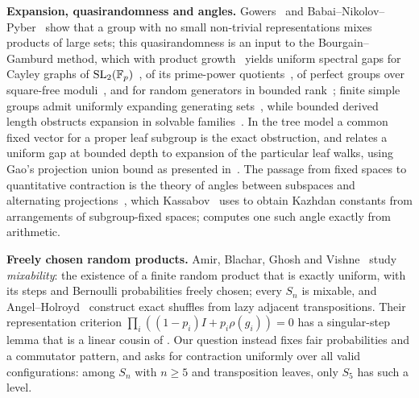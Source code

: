 \medskip\noindent\textbf{Expansion, quasirandomness and angles.}
Gowers~\cite{Gowers2008} and Babai--Nikolov--Pyber~\cite{BabaiNikolovPyber2008}
show that a group with no small non-trivial representations mixes
products of large sets; this quasirandomness is an input to the
Bourgain--Gamburd method, which with product
growth~\cite{Helfgott2008,BGT2011,PyberSzabo2016} yields uniform spectral
gaps for Cayley graphs of $\operatorname{SL}_2(\mathbb{F}_p)$~\cite{BourgainGamburd},
of its prime-power quotients~\cite{BourgainGamburdJEMS2008,BourgainVarju2012},
of perfect groups over square-free moduli~\cite{SalehiVarju}, and for
random generators in bounded rank~\cite{BGGT2015}; finite simple groups
admit uniformly expanding generating sets~\cite{KLN2006}, while bounded
derived length obstructs expansion in solvable
families~\cite{LubotzkyWeiss1993}. In the tree model a common fixed
vector for a proper leaf subgroup is the exact obstruction, and
 relates a uniform gap at bounded depth to
expansion of the particular leaf walks, using Gao's projection union bound
as presented in~\cite{AnshuAradVidick2016}. The passage from fixed spaces
to quantitative contraction is the theory of angles between subspaces and
alternating projections~\cite{KayalarWeinert1988,BadeaGrivauxMuller2010},
which Kassabov~\cite{Kassabov2011} uses to obtain Kazhdan constants from
arrangements of subgroup-fixed spaces;  computes one such
angle exactly from arithmetic.

\medskip\noindent\textbf{Freely chosen random products.}
Amir, Blachar, Ghosh and Vishne~\cite{AmirMixability} study
\emph{mixability}: the existence of a finite random product that is
exactly uniform, with its steps and Bernoulli probabilities freely chosen;
every $S_n$ is mixable, and Angel--Holroyd~\cite{AngelHolroyd2018}
construct exact shuffles from lazy adjacent transpositions. Their
representation criterion $\prod_i((1-p_i)I+p_i\rho(g_i))=0$ has a
singular-step lemma that is a linear cousin of . Our
question instead fixes fair probabilities and a commutator pattern, and
asks for contraction uniformly over all valid configurations: among $S_n$
with $n\ge5$ and transposition leaves, only $S_5$ has such a level.


